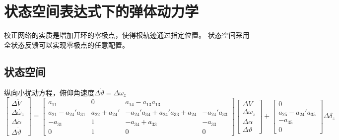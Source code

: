 \section{状态空间表达式下的弹体动力学}
校正网络的实质是增加开环的零极点，使得根轨迹通过指定位置。
状态空间采用全状态反馈可以实现零极点的任意配置。
\subsection{状态空间}
纵向小扰动方程，俯仰角速度$\Delta\dot{\vartheta}=\Delta\omega_z$
\begin{equation*}
    \left[
        \begin{smallmatrix}
            \Delta\dot{V}\\
            \Delta\dot{\omega_z}\\
            \Delta\dot{\alpha}\\
            \Delta\dot{\vartheta}
        \end{smallmatrix}
    \right] = 
    \left[
    \begin{smallmatrix}
        a_{11} & 0 &a_{14}-a_{13} a_{13} \\
        a_{21}-a_{24}'a_{31} &a_{22}+a_{24}' &-a_{24}'a_{34}+a_{24}'a_{33}+a_{24} &-a_{24}'a_{33}\\
        -a_{31} &1 &-a_{34}+a_{33} &-a_{33}\\
        0 &1 &0 &0
    \end{smallmatrix}
    \right]
    \left[
    \begin{smallmatrix}
        \Delta{V}\\
        \Delta{\omega_z}\\
        \Delta{\alpha}\\
        \Delta{\vartheta}
    \end{smallmatrix}
    \right]+
    \left[
    \begin{smallmatrix}
        0\\
        a_{25}-a_{24}'a_{35}\\
        -a_{35}\\
        0
    \end{smallmatrix}
    \right]
    \Delta\delta_z
\end{equation*}

